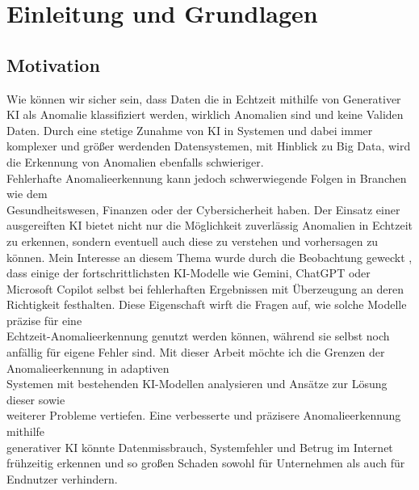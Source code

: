 \chapter{Einleitung und Grundlagen}
\label{ch:einl}
\section{Motivation}
Wie können wir sicher sein, dass Daten die in Echtzeit mithilfe von Generativer KI als Anomalie klassifiziert werden, wirklich Anomalien sind und keine Validen Daten. Durch eine stetige Zunahme von KI in Systemen und dabei immer komplexer und größer werdenden Datensystemen, mit Hinblick zu Big Data, wird die Erkennung von Anomalien ebenfalls schwieriger.\\ Fehlerhafte Anomalieerkennung kann jedoch schwerwiegende Folgen in Branchen wie dem \\ Gesundheitswesen, Finanzen oder der Cybersicherheit haben. Der Einsatz einer ausgereiften KI bietet nicht nur die Möglichkeit zuverlässig Anomalien in Echtzeit zu erkennen, sondern eventuell auch diese zu verstehen und vorhersagen zu können. Mein Interesse an diesem Thema wurde durch die Beobachtung geweckt , dass einige der fortschrittlichsten KI-Modelle wie Gemini, ChatGPT oder Microsoft Copilot selbst bei fehlerhaften Ergebnissen mit Überzeugung an deren Richtigkeit festhalten. Diese Eigenschaft wirft die Fragen auf, wie solche Modelle präzise für eine \\ Echtzeit-Anomalieerkennung genutzt werden können, während sie selbst noch anfällig für eigene Fehler sind. Mit dieser Arbeit möchte ich die Grenzen der Anomalieerkennung in adaptiven \\ Systemen mit bestehenden KI-Modellen analysieren und Ansätze zur Lösung dieser sowie \\ weiterer Probleme vertiefen. Eine verbesserte und präzisere Anomalieerkennung mithilfe \\generativer KI könnte Datenmissbrauch, Systemfehler und Betrug im Internet frühzeitig erkennen und so großen Schaden sowohl für Unternehmen als auch für Endnutzer verhindern. 

\label{sec:einl_motivation}
